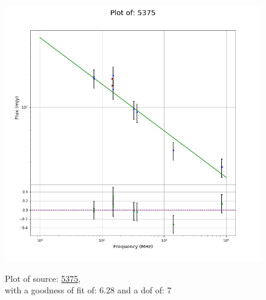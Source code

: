 \documentclass{article}
\begin{document}
\begin{figure}[H]
    \centering
    \begin{minipage}{.5\textwidth}
        \centering
        \includegraphics[scale = 0.35]{KmeulenSimSource_1hr/1hr5375.png}
        \captionsetup{labelformat=empty}
        \caption{Plot of source: \href{http://banana.transientskp.org/r4/vlo_KmeulenSimSource/runningcatalog/5375}{5375},\\with a goodness of fit of: 6.28 and a dof of: 7}
        \addtocounter{figure}{-1}
        \label{KmeulenSimSource:1hr:5375:plot}
    \end{minipage}%
    \begin{minipage}{0.5\textwidth}
        \centering


\end{minipage}
\end{figure}
\end{document}
